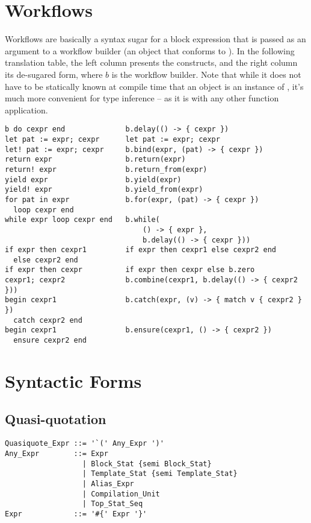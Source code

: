 \section{Workflows}
\label{sec:workflows}

Workflows are basically a syntax sugar for a block expression that is passed as an argument to a workflow builder (an object that conforms to ). In the following translation table, the left column presents the constructs, and the right column its de-sugared form, where $b$ is the workflow builder. Note that while it does not have to be statically known at compile time that an object is an instance of , it's much more convenient for type inference -- as it is with any other function application. 

\begin{lstlisting}
b do cexpr end              b.delay(() -> { cexpr })
let pat := expr; cexpr      let pat := expr; cexpr
let! pat := expr; cexpr     b.bind(expr, (pat) -> { cexpr })
return expr                 b.return(expr)
return! expr                b.return_from(expr)
yield expr                  b.yield(expr)
yield! expr                 b.yield_from(expr)
for pat in expr             b.for(expr, (pat) -> { cexpr })
  loop cexpr end 
while expr loop cexpr end   b.while(
                                () -> { expr }, 
                                b.delay(() -> { cexpr }))
if expr then cexpr1         if expr then cexpr1 else cexpr2 end
  else cexpr2 end
if expr then cexpr          if expr then cexpr else b.zero
cexpr1; cexpr2              b.combine(cexpr1, b.delay(() -> { cexpr2 }))
begin cexpr1                b.catch(expr, (v) -> { match v { cexpr2 } })
  catch cexpr2 end
begin cexpr1                b.ensure(cexpr1, () -> { cexpr2 })
  ensure cexpr2 end
\end{lstlisting}






\section{Syntactic Forms}
\label{sec:syntactic-forms}

\subsection{Quasi-quotation}
\label{sec:quasi-quotation}

\syntax\begin{lstlisting}
Quasiquote_Expr ::= '`(' Any_Expr ')'
Any_Expr        ::= Expr
                  | Block_Stat {semi Block_Stat}
                  | Template_Stat {semi Template_Stat}
                  | Alias_Expr
                  | Compilation_Unit
                  | Top_Stat_Seq
Expr            ::= '#{' Expr '}'
\end{lstlisting}

